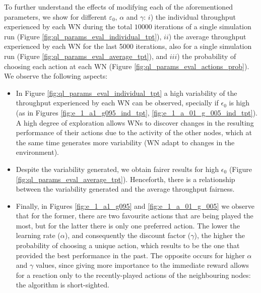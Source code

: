 \documentclass{article}
\begin{document}
	To further understand the effects of modifying each of the aforementioned parameters, we show for different $\varepsilon_0$, $\alpha$ and $\gamma$: $i$) the individual throughput experienced by each WN during the total $10000$ iterations of a single simulation run (Figure \ref{fig:ql_params_eval_individual_tpt}), $ii$) the average throughput experienced by each WN for the last 5000 iterations, also for a single simulation run (Figure \ref{fig:ql_params_eval_average_tpt}), and $iii$) the probability of choosing each action at each WN (Figure \ref{fig:ql_params_eval_actions_prob}). We observe the following aspects:
	\begin{itemize}
		\item In Figure \ref{fig:ql_params_eval_individual_tpt} a high variability of the throughput experienced by each WN can be observed, specially if $\epsilon_0$ is high (as in Figures \ref{fig:e_1_a1_g095_ind_tpt}, \ref{fig:e_1_a_01_g_005_ind_tpt}). A high degree of exploration allows WNs to discover changes in the resulting performance of their actions due to the activity of the other nodes, which at the same time generates more variability (WN adapt to changes in the environment).
		\item Despite the variability generated, we obtain fairer results for high $\epsilon_0$ (Figure \ref{fig:ql_params_eval_average_tpt}). Henceforth, there is a relationship between the variability generated and the average throughput fairness.
		\item Finally, in Figures \ref{fig:e_1_a1_g095} and \ref{fig:e_1_a_01_g_005} we observe that for the former, there are two favourite actions that are being played the most, but for the latter there is only one preferred action. The lower the learning rate ($\alpha$), and consequently the discount factor ($\gamma$), the higher the probability of choosing a unique action, which results to be the one that provided the best performance in the past. The opposite occurs for higher $\alpha$ and $\gamma$ values, since giving more importance to the immediate reward allows for a reaction only to the recently-played actions of the neighbouring nodes: the algorithm is short-sighted. 
	\end{itemize}
	
\end{document}
